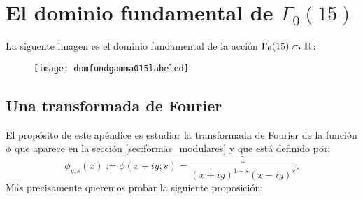 \chapter{El dominio fundamental de $\Gamma_0(15)$}
La siguente imagen es el dominio fundamental de la acci\'on $\Gamma_0(15)\curvearrowright\mathbb{H}$:

\begin{figure}[!h]%
  \centering
  \texttt{[image: domfundgamma015labeled]}
\end{figure}%


\section{Una transformada de Fourier}

El prop\'osito de este ap\'endice es estudiar la transformada de Fourier de la funci\'on $\phi$
que aparece en la secci\'on \ref{sec:formas_modulares} y que est\'a definido por:
\[
  \phi_{y,s}(x):=\phi(x+iy;s)=\frac{1}{(x+iy)^{1+s}(x-iy)^s}.
\]
M\'as precisamente queremos probar la siguiente proposici\'on:

